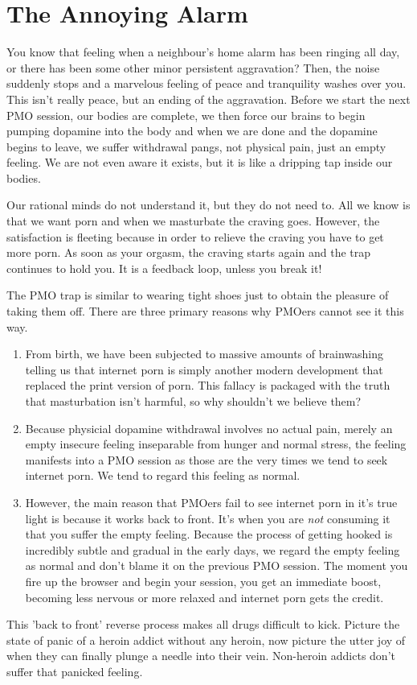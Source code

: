 \documentclass[easypeasy.tex]{subfiles}
\begin{document}
\section{The Annoying Alarm}
You know that feeling when a neighbour's home alarm has been ringing all day, or there has been some other minor persistent aggravation? Then, the noise suddenly stops and a marvelous feeling of peace and tranquility washes over you. This isn't really peace, but an ending of the aggravation. Before we start the next PMO session, our bodies are complete, we then force our brains to begin pumping dopamine into the body and when we are done and the dopamine begins to leave, we suffer withdrawal pangs, not physical pain, just an empty feeling. We are not even aware it exists, but it is like a dripping tap inside our bodies.

Our rational minds do not understand it, but they do not need to. All we know is that we want porn and when we masturbate the craving goes. However, the satisfaction is fleeting because in order to relieve the craving you have to get more porn. As soon as your orgasm, the craving starts again and the trap continues to hold you. It is a feedback loop, unless you break it!

The PMO trap is similar to wearing tight shoes just to obtain the pleasure of taking them off. There are three primary reasons why PMOers cannot see it this way.

\begin{enumerate}
  \item From birth, we have been subjected to massive amounts of brainwashing telling us that internet porn is simply another modern development that replaced the print version of porn. This fallacy is packaged with the truth that masturbation isn't harmful, so why shouldn't we believe them?

  \item Because physicial dopamine withdrawal involves no actual pain, merely an empty insecure feeling inseparable from hunger and normal stress, the feeling manifests into a PMO session as those are the very times we tend to seek internet porn. We tend to regard this feeling as normal.

  \item However, the main reason that PMOers fail to see internet porn in it's true light is because it works back to front. It's when you are \textit{not} consuming it that you suffer the empty feeling. Because the process of getting hooked is incredibly subtle and gradual in the early days, we regard the empty feeling as normal and don't blame it on the previous PMO session. The moment you fire up the browser and begin your session, you get an immediate boost, becoming less nervous or more relaxed and internet porn gets the credit.
  \end{enumerate}
This 'back to front' reverse process makes all drugs difficult to kick. Picture the state of panic of a heroin addict without any heroin, now picture the utter joy of when they can finally plunge a needle into their vein. Non-heroin addicts don't suffer that panicked feeling.
\end{document}
